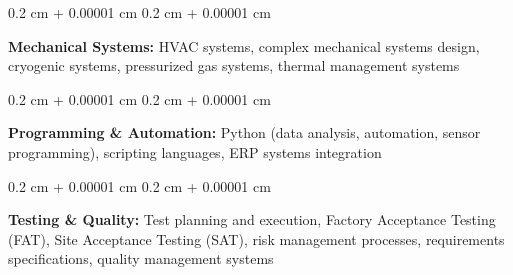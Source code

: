 \documentclass[10pt, letterpaper]{article}
\newenvironment{onecolentry}{
    \begin{adjustwidth}{
        0.2 cm + 0.00001 cm
    }{
        0.2 cm + 0.00001 cm
    }
}{
    \end{adjustwidth}
} %
\begin{document}
        \begin{onecolentry}
            \textbf{Mechanical Systems:} HVAC systems, complex mechanical systems design, cryogenic systems, pressurized gas systems, thermal management systems
        \end{onecolentry}

        \vspace{0.2 cm}

        \begin{onecolentry}
            \textbf{Programming \& Automation:} Python (data analysis, automation, sensor programming), scripting languages, ERP systems integration
        \end{onecolentry}

        \vspace{0.2 cm}

        \begin{onecolentry}
            \textbf{Testing \& Quality:} Test planning and execution, Factory Acceptance Testing (FAT), Site Acceptance Testing (SAT), risk management processes, requirements specifications, quality management systems
        \end{onecolentry}


    
\end{document}
